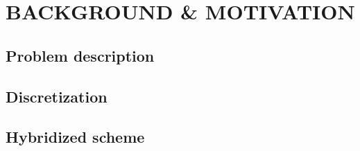 %
%
%
\section{\large BACKGROUND \& MOTIVATION}


%
%
%
%

%
%
%
\subsection{Problem description}


%
%
%
\subsection{Discretization}


%
%
%
\subsection{Hybridized scheme}

